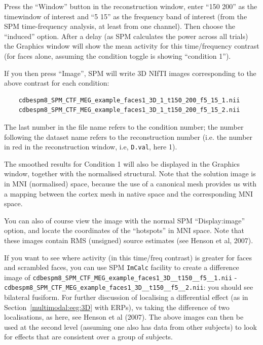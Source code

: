 Press the ``Window'' button in the reconstruction window, enter ``150 200'' as the timewindow of interest and ``5 15'' as the frequency band of interest (from the SPM time-frequency analysis, at least from one channel). Then choose the ``induced'' option. After a delay (as SPM calculates the power across all trials) the Graphics window will show the mean activity for this time/frequency contrast (for faces alone, assuming the condition toggle is showing ``condition 1'').

If you then press ``Image'', SPM will write 3D NIfTI images corresponding to the above contrast for each condition:

\begin{verbatim}
    cdbespm8_SPM_CTF_MEG_example_faces1_3D_1_t150_200_f5_15_1.nii
    cdbespm8_SPM_CTF_MEG_example_faces1_3D_1_t150_200_f5_15_2.nii
\end{verbatim}

The last number in the file name refers to the condition number; the number following the dataset name refers to the reconstruction number (i.e. the number in red in the reconstruction window, i.e, \texttt{D.val}, here 1).

The smoothed results for Condition 1 will also be displayed in the Graphics window, together with the normalised structural. Note that the solution image is in MNI (normalised) space, because the use of a canonical mesh provides us with a mapping between the cortex mesh in native space and the corresponding MNI space.

You can also of course view the image with the normal SPM ``Display:image'' option, and locate the coordinates of the ``hotspots'' in MNI space. Note that these images contain RMS (unsigned) source estimates (see Henson et al, 2007).

If you want to see where activity (in this time/freq contrast) is greater for faces and scrambled faces, you can use SPM \texttt{ImCalc} facility to create a difference image of \texttt{cdbespm8\_\-SPM\_\-CTF\_\-MEG\_\-example\_\-faces1\_\-3D\_\_\-t150\_\_\-f5\_\_\-1.nii} - \texttt{cdbespm8\_\-SPM\_\-CTF\_\-MEG\_\-example\_\-faces1\_\-3D\_\_\-t150\_\_\-f5\_\_\-2.nii}: you should see bilateral fusiform. For further discussion of localising a differential effect (as in Section~\ref{multimodal:eeg:3D} with ERPs), vs taking the difference of two localisations, as here, see Henson et al (2007). The above images can then be used at the second level (assuming one also has data from other subjects) to look for effects that are consistent over a group of subjects.

